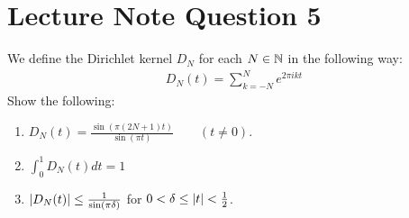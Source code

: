 \section{Lecture Note Question 5}
\horz
 We define the Dirichlet kernel $D_{N}$ for each $N\in \mathbb N$ in the following way:
\begin{align*}
D_{N} (t) = \sum_{k=-N}^{N} e^{2\pi i k t}
\end{align*}
Show the following:
\begin{enumerate}
\item $D_{N} (t) = \frac{\sin \left( \pi \left( 2N + 1 \right) t \right)}{\sin \left( \pi t \right)} \qquad \left( t\ne 0 \right)$.
\item $\int_{0}^{1} D_{N} (t) dt = 1$
\item $\left\lvert D_{N} (t) \right\rvert \le \frac{1}{ \sin \left( \pi \delta \right)}$ for $0 < \delta \le \left\lvert t \right\rvert < \frac{1}{2}$.
\end{enumerate}
\horz
